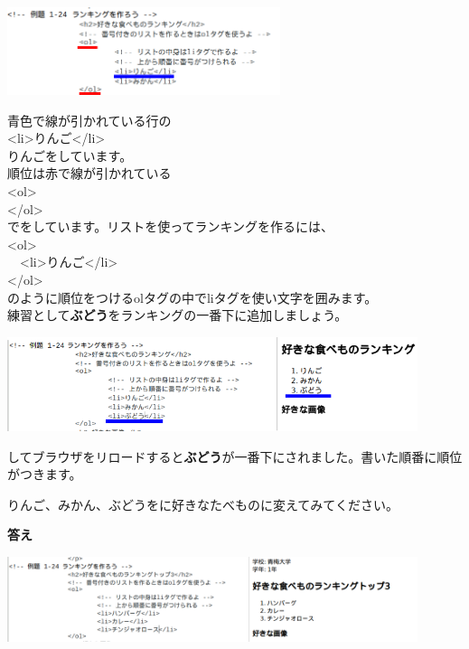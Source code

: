 \documentclass[a4paper,12pt]{jarticle}
\begin{document}
\bigskip


\includegraphics[width=0.6\textwidth]{textbook-img181.png}


青色で線が引かれている行の\\
{\textless}li{\textgreater}りんご{\textless}/li{\textgreater}\\
りんごをしています。\\
順位は赤で線が引かれている\\
{\textless}ol{\textgreater}\\
{\textless}/ol{\textgreater}\\
でをしています。リストを使ってランキングを作るには、\\
{\textless}ol{\textgreater}\\
\ \ {\textless}li{\textgreater}りんご{\textless}/li{\textgreater}\\
{\textless}/ol{\textgreater}\\
のように順位をつけるolタグの中でliタグを使い文字を囲みます。\\
練習として\textbf{ぶどう}をランキングの一番下に追加しましょう。\\


\bigskip


\includegraphics[width=0.9\textwidth]{textbook-img183.png}


\bigskip


してブラウザをリロードすると\textbf{ぶどう}が一番下にされました。書いた順番に順位がつきます。

りんご、みかん、ぶどうをに好きなたべものに変えてみてください。


\bigskip
\clearpage
\textbf{答え}


\bigskip



\includegraphics[width=0.9\textwidth]{textbook-img184.png}
\end{document}
